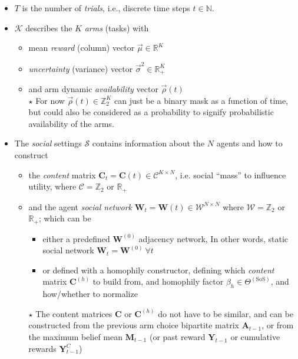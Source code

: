 \documentclass[fleqn]{article}
\begin{document}
\begin{itemize}
    \item $T$ is the number of \textit{trials}, i.e., discrete time steps $t \in \mathbb{N}$.
    \item $\mathcal{K}$ describes the $K$ \textit{arms} (tasks) with
        \begin{itemize}
            \item mean \textit{reward} (column) vector $\overrightarrow{\mu} \in \mathbb{R}^K$
            \item \textit{uncertainty} (variance) vector $\overrightarrow{\sigma}^2 \in \mathbb{R}_{+}^K$
            \item and arm dynamic \textit{availability} vector $\overrightarrow{\rho}(t)$ \\
            $\star$ For now $\overrightarrow{\rho}(t) \in \mathbb{Z}_2^K$
                can just be a binary mask as a function of time,
                but could also be considered as a probability to signify probabilistic availability of the arms.
        \end{itemize}
    \item The \textit{social} settings $\mathcal{S}$ contains information about the $N$ agents and how to construct
        \begin{itemize}
            \item the \textit{content} matrix $\mathbf{C}_t = \mathbf{C}(t) \in \mathcal{C}^{K \times N}$,
            i.e. social ``mass'' to influence utility,
            where $\mathcal{C} = \mathbb{Z}_2$ or  $\mathbb{R}_{+}$
            \item and the agent \textit{social network} $\mathbf{W}_t = \mathbf{W}(t) \in \mathcal{W}^{N \times N}$
            where $\mathcal{W} = \mathbb{Z}_2$ or  $\mathbb{R}_{+}$; which can be
            \begin{itemize}
                \item either a predefined $\mathbf{W}^{(0)}$ adjacency network,
                In other words, static social network $\mathbf{W}_t = \mathbf{W}^{(0)} \ \forall t$
                \item or defined with a homophily constructor, defining
                    which \textit{content} matrix $\mathbf{C}^{(h)}$ to build from,
                    and homophily factor $\beta_h \in \Theta^{\mathrm{(SoS)}}$,
                    and how/whether to normalize
            \end{itemize}
            $\star$ The content matrices $\mathbf{C}$ or $\mathbf{C}^{(h)}$ do not have to be similar,
                and can be constructed from the previous arm choice bipartite matrix $\mathbf{A}_{t-1}$,
                or from the maximum belief mean $\mathbf{M}_{t-1}$ (or
                    past reward $\mathbf{Y}_{t-1}$
                    or cumulative rewards $\mathbf{Y}^C_{t-1}$)
        \end{itemize}
\end{itemize}
\end{document}

